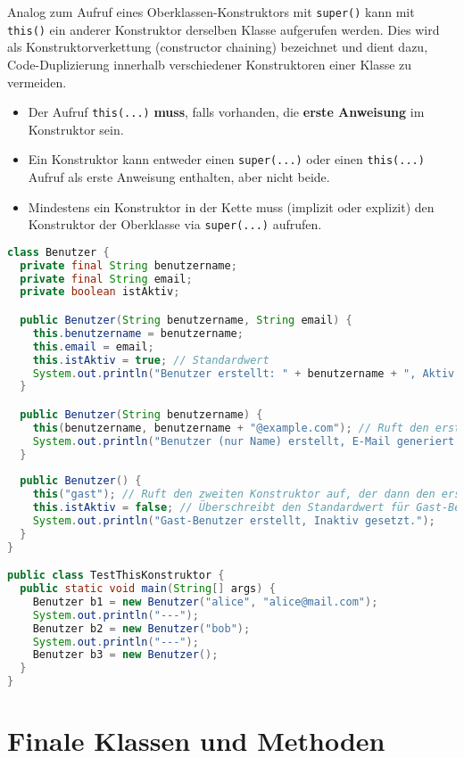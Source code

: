 Analog zum Aufruf eines Oberklassen-Konstruktors mit \texttt{super()} kann mit
\texttt{this()} ein anderer Konstruktor derselben Klasse aufgerufen werden.
Dies wird als Konstruktorverkettung (constructor chaining) bezeichnet und dient
dazu, Code-Duplizierung innerhalb verschiedener Konstruktoren einer Klasse zu
vermeiden.
\begin{itemize}
  \item Der Aufruf \texttt{this(...)} \textbf{muss}, falls vorhanden, die \textbf{erste
          Anweisung} im Konstruktor sein.
  \item Ein Konstruktor kann entweder einen \texttt{super(...)} oder einen
        \texttt{this(...)} Aufruf als erste Anweisung enthalten, aber nicht beide.
  \item Mindestens ein Konstruktor in der Kette muss (implizit oder explizit) den
        Konstruktor der Oberklasse via \texttt{super(...)} aufrufen.
\end{itemize}

\begin{lstlisting}[language=Java, caption={Aufruf eines anderen Konstruktors derselben Klasse via \texttt{this()}}]
class Benutzer {
  private final String benutzername;
  private final String email;
  private boolean istAktiv;

  public Benutzer(String benutzername, String email) {
    this.benutzername = benutzername;
    this.email = email;
    this.istAktiv = true; // Standardwert
    System.out.println("Benutzer erstellt: " + benutzername + ", Aktiv: " + istAktiv);
  }

  public Benutzer(String benutzername) {
    this(benutzername, benutzername + "@example.com"); // Ruft den ersten Konstruktor auf
    System.out.println("Benutzer (nur Name) erstellt, E-Mail generiert.");
  }
    
  public Benutzer() {
    this("gast"); // Ruft den zweiten Konstruktor auf, der dann den ersten aufruft
    this.istAktiv = false; // Überschreibt den Standardwert für Gast-Benutzer
    System.out.println("Gast-Benutzer erstellt, Inaktiv gesetzt.");
  }
}

public class TestThisKonstruktor {
  public static void main(String[] args) {
    Benutzer b1 = new Benutzer("alice", "alice@mail.com");
    System.out.println("---");
    Benutzer b2 = new Benutzer("bob");
    System.out.println("---");
    Benutzer b3 = new Benutzer();
  }
}
\end{lstlisting}

\section{Finale Klassen und Methoden}
\label{sec:final}

